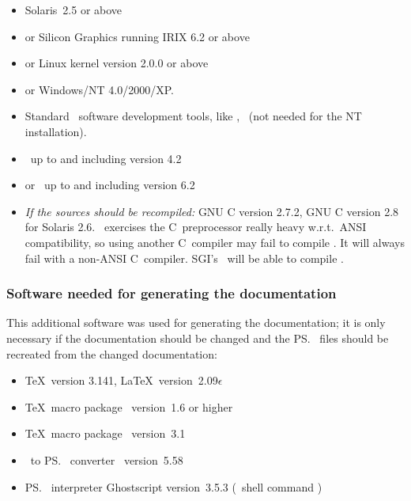 \begin{itemize}

\item Solaris~2.5 or above

\item or Silicon Graphics running IRIX 6.2 or above

\item or Linux kernel version 2.0.0 or above

\item or Windows/NT 4.0/2000/XP.

\item Standard \unix\ software development tools, like ,
  \ (not needed for the NT installation).

\item \lwcl\ up to and including version 4.2

\item or \allegrocl\ up to and including version 6.2

\item \emph{If the sources should be recompiled:}
  GNU C version 2.7.2, GNU C version 2.8 for Solaris 2.6. \plob\ 
  exercises the C~preprocessor really heavy w.r.t.\ ANSI
  compatibility, so using another C~compiler may fail to compile
  \plob. It will always fail with a non-ANSI C~compiler. SGI's
  \ will be able to compile \plobwoexcl.

\end{itemize}

\subsubsection[Generating the documentation]
{Software needed for generating the documentation}

This additional software was used for generating the documentation; it
is only necessary if the documentation should be changed and the \ps\ 
files should be recreated from the changed documentation:

\begin{itemize}

\item \TeX\ version 3.141, \LaTeX\ version~2.09$\epsilon$

\item \TeX\ macro package \ version~1.6 or higher

\item \TeX\ macro package \ version~3.1

\item {}\ to \ps\ converter \ version~5.58

\item \ps\ interpreter Ghostscript version~3.5.3 (\unix\ shell
command )

\end{itemize}


